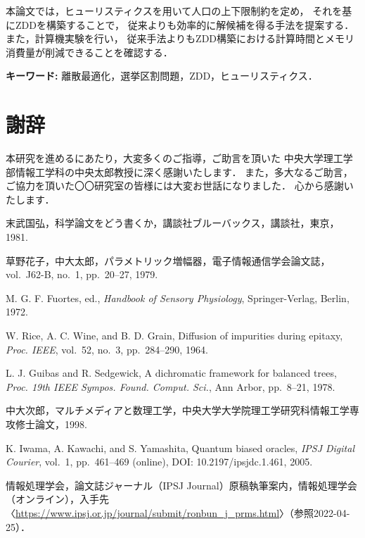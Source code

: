 ﻿\documentclass[a4j,12pt]{jreport}
\def\syaji{ \chapter*{謝辞} \addcontentsline{toc}{chapter}{謝辞}}
\begin{document}
本論文では，ヒューリスティクスを用いて人口の上下限制約を定め，
それを基にZDDを構築することで，
従来よりも効率的に解候補を得る手法を提案する．
また，計算機実験を行い，
従来手法よりもZDD構築における計算時間とメモリ消費量が削減できることを確認する．


\vspace{1zw} \noindent
{\bf キーワード: }離散最適化，選挙区割問題，ZDD，ヒューリスティクス．

\tableofcontents


\newpage
{}








\syaji
\par
本研究を進めるにあたり，大変多くのご指導，ご助言を頂いた
中央大学理工学部情報工学科の中央太郎教授に深く感謝いたします．
また，多大なるご助言，ご協力を頂いた〇〇研究室の皆様には大変お世話になりました．
心から感謝いたします．


\begin{thebibliography}{99}


末武国弘，科学論文をどう書くか，講談社ブルーバックス，講談社，東京，1981. 

草野花子，中大太郎，パラメトリック増幅器，電子情報通信学会論文誌，vol.~J62-B, no.~1, pp.~20--27, 1979. 

M. G. F. Fuortes, ed., \textit{Handbook of Sensory Physiology}, Springer-Verlag, Berlin, 1972.

W. Rice, A. C. Wine, and B. D. Grain, Diffusion of impurities during epitaxy, \textit{Proc. IEEE}, vol.~52, no.~3, pp.~284--290, 1964.

L. J. Guibas and R. Sedgewick, A dichromatic framework for balanced trees, 
\textit{Proc. 19th IEEE Sympos. Found. Comput. Sci.}, Ann Arbor, pp.~8--21, 1978.

中大次郎，マルチメディアと数理工学，中央大学大学院理工学研究科情報工学専攻修士論文，1998.

K. Iwama, A. Kawachi, and S. Yamashita, Quantum biased oracles, \textit{IPSJ Digital Courier}, vol.~1, pp.~461--469 (online), DOI: 10.2197/ipsjdc.1.461, 2005.

情報処理学会，論文誌ジャーナル（IPSJ Journal）原稿執筆案内，情報処理学会（オンライン），入手先〈\url{https://www.ipsj.or.jp/journal/submit/ronbun_j_prms.html}〉（参照2022-04-25）．


\end{thebibliography}

\end{document}
